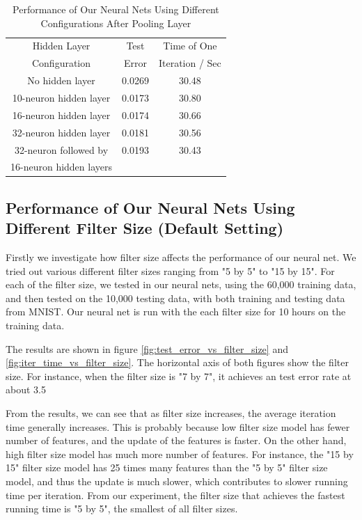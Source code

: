 \documentclass[10pt,twocolumn]{article}
\begin{document}
\begin{table}
\caption{Performance of Our Neural Nets Using Different Configurations After Pooling Layer}
\begin{center}
\begin{tabular}{| c | c | c |}
\hline
Hidden Layer & Test & Time of One\\
Configuration & Error & Iteration / Sec \\
\hline
No hidden layer & 0.0269 & 30.48\\ \hline
10-neuron hidden layer & 0.0173 & 30.80\\ \hline

16-neuron hidden layer & 0.0174 & 30.66\\ \hline
32-neuron hidden layer & 0.0181 & 30.56\\ \hline
32-neuron followed by & 0.0193 & 30.43\\
16-neuron hidden layers & &\\ \hline
\hline

\end{tabular}
\end{center}
\label{table:change_in_neurons_in_hidden_layer}
\end{table}
\FloatBarrier

\subsection{Performance of Our Neural Nets Using Different Filter Size (Default Setting)}

Firstly we investigate how filter size affects the performance of our neural net. We tried out various different filter sizes ranging from "5 by 5" to "15 by 15". For each of the filter size, we tested in our neural nets, using the 60,000 training data, and then tested on the 10,000 testing data, with both training and testing data from MNIST. Our neural net is run with the each filter size for 10 hours on the training data.

The results are shown in figure \ref{fig:test_error_vs_filter_size} and \ref{fig:iter_time_vs_filter_size}. The horizontal axis of both figures show the filter size. For instance, when the filter size is "7 by 7", it achieves an test error rate at about 3.5%

From the results, we can see that as filter size increases, the average iteration time generally increases. This is probably because low filter size model has fewer number of features, and the update of the features is faster. On the other hand, high filter size model has much more number of features. For instance, the "15 by 15" filter size model has 25 times many features than the "5 by 5" filter size model, and thus the update is much slower, which contributes to slower running time per iteration. From our experiment, the filter size that achieves the fastest running time is "5 by 5", the smallest of all filter sizes.
\end{document}
